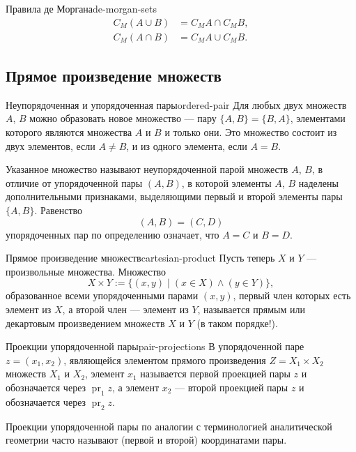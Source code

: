 \begin{properties}{Правила де Моргана}{de-morgan-sets}
  \begin{align}
    C_M(A\cup B)&=C_MA\cap C_MB,\\
    C_M(A\cap B)&=C_MA\cup C_MB.
  \end{align}
\end{properties}

\subsection{Прямое произведение множеств}

\begin{definition}{Неупорядоченная и упорядоченная пары}{ordered-pair}
  Для любых двух множеств $A$, $B$ можно образовать новое множество — пару
  $\{A,B\}=\{B,A\}$, элементами которого являются множества $A$ и $B$ и
  только они. Это множество состоит из двух элементов, если $A\ne B$, и из
  одного элемента, если $A=B$.

  Указанное множество называют неупорядоченной парой множеств $A$, $B$, в
  отличие от упорядоченной пары $(A,B)$, в которой элементы $A$, $B$ наделены
  дополнительными признаками, выделяющими первый и второй элементы пары
  $\{A,B\}$. Равенство
  \[
    (A,B)=(C,D)
  \]
  упорядоченных пар по определению означает, что $A=C$ и $B=D$.
\end{definition}

\begin{definition}{Прямое произведение множеств}{cartesian-product}
  Пусть теперь $X$ и $Y$ — произвольные множества. Множество
  \[
    X\times Y:=\{(x,y)\mid(x\in X)\land(y\in Y)\},
  \]
  образованное всеми упорядоченными парами $(x,y)$, первый член которых есть
  элемент из $X$, а второй член — элемент из $Y$, называется прямым или
  декартовым произведением множеств $X$ и $Y$ (в таком порядке!).
\end{definition}

\begin{definition}{Проекции упорядоченной пары}{pair-projections}
  В упорядоченной паре $z=(x_1,x_2)$, являющейся элементом прямого
  произведения $Z=X_1\times X_2$ множеств $X_1$ и $X_2$, элемент $x_1$
  называется первой проекцией пары $z$ и обозначается через $\operatorname{pr}_1z$,
  а элемент $x_2$ — второй проекцией пары $z$ и обозначается через
  $\operatorname{pr}_2z$.

  Проекции упорядоченной пары по аналогии с терминологией аналитической
  геометрии часто называют (первой и второй) координатами пары.
\end{definition}

